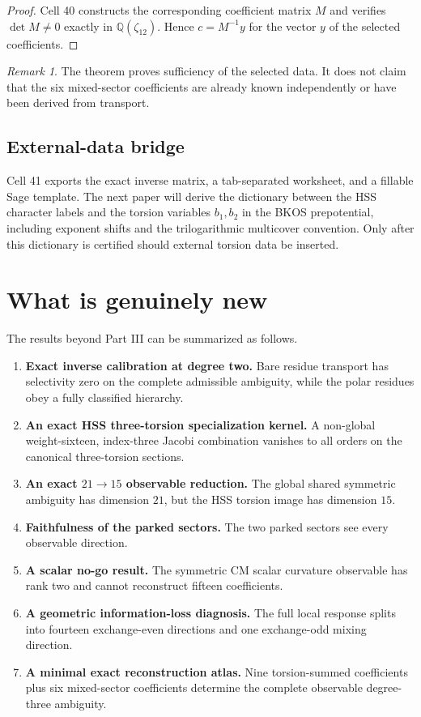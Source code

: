 \documentclass[11pt]{article}
\theoremstyle{definition}
\theoremstyle{remark}
\newtheorem{remark}[theorem]{Remark}
\newcommand{\Q}{\mathbb{Q}}
\begin{document}
\begin{proof}
Cell 40 constructs the corresponding coefficient matrix $M$ and verifies $\det M\neq0$ exactly in $\Q(\zeta_{12})$.  Hence $c=M^{-1}y$ for the vector $y$ of the selected coefficients.
\end{proof}

\begin{remark}
The theorem proves sufficiency of the selected data.  It does not claim that the six mixed-sector coefficients are already known independently or have been derived from transport.
\end{remark}

\subsection{External-data bridge}

Cell 41 exports the exact inverse matrix, a tab-separated worksheet, and a fillable Sage template.  The next paper will derive the dictionary between the HSS character labels and the torsion variables $b_1,b_2$ in the BKOS prepotential, including exponent shifts and the trilogarithmic multicover convention.  Only after this dictionary is certified should external torsion data be inserted.

\section{What is genuinely new}

The results beyond Part III can be summarized as follows.

\begin{enumerate}[leftmargin=*,label=\arabic*.]
\item \textbf{Exact inverse calibration at degree two.}  Bare residue transport has selectivity zero on the complete admissible ambiguity, while the polar residues obey a fully classified hierarchy.
\item \textbf{An exact HSS three-torsion specialization kernel.}  A non-global weight-sixteen, index-three Jacobi combination vanishes to all orders on the canonical three-torsion sections.
\item \textbf{An exact $21\to15$ observable reduction.}  The global shared symmetric ambiguity has dimension $21$, but the HSS torsion image has dimension $15$.
\item \textbf{Faithfulness of the parked sectors.}  The two parked sectors see every observable direction.
\item \textbf{A scalar no-go result.}  The symmetric CM scalar curvature observable has rank two and cannot reconstruct fifteen coefficients.
\item \textbf{A geometric information-loss diagnosis.}  The full local response splits into fourteen exchange-even directions and one exchange-odd mixing direction.
\item \textbf{A minimal exact reconstruction atlas.}  Nine torsion-summed coefficients plus six mixed-sector coefficients determine the complete observable degree-three ambiguity.
\end{enumerate}
\end{document}
